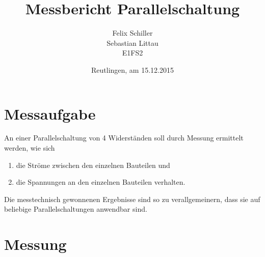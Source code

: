 \documentclass[
a4paper,     %
 headsepline, %
11pt         %
]{scrartcl}  %
\title{Messbericht Parallelschaltung}
\author{Felix Schiller \\ Sebastian Littau \\ E1FS2}
\date{Reutlingen, am 15.12.2015}
\begin{document}

\maketitle

\newpage
\tableofcontents





\section{Messaufgabe}
An einer Parallelschaltung von 4 Widerständen soll durch Messung ermittelt werden, wie sich 
\begin{enumerate}
	\item die Ströme zwischen den einzelnen Bauteilen und 
	\item die Spannungen an den einzelnen Bauteilen verhalten. 
\end{enumerate}
Die messtechnisch gewonnenen Ergebnisse sind so zu verallgemeinern, dass sie auf beliebige Parallelschaltungen anwendbar sind.

\section{Messung}
\end{document}
